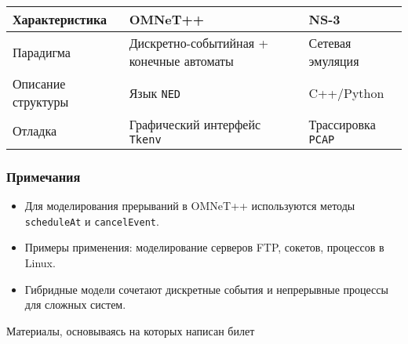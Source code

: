 \begin{center}
    \begin{tabular}{|l|l|l|}
        \hline
        \textbf{Характеристика} & \textbf{OMNeT++} & \textbf{NS-3} \\
        \hline
        Парадигма & Дискретно-событийная + конечные автоматы & Сетевая эмуляция \\
        \hline
        Описание структуры & Язык \texttt{NED} & C++/Python \\
        \hline
        Отладка & Графический интерфейс \texttt{Tkenv} & Трассировка \texttt{PCAP} \\
        \hline
    \end{tabular}
\end{center}

\subsubsection*{Примечания}
\begin{itemize}
    \item Для моделирования прерываний в OMNeT++ используются методы \texttt{scheduleAt} и \texttt{cancelEvent}.
    \item Примеры применения: моделирование серверов FTP, сокетов, процессов в Linux.
    \item Гибридные модели сочетают дискретные события и непрерывные процессы для сложных систем.
\end{itemize}

Материалы, основываясь на которых написан билет~\cite{imitation_modeling}
